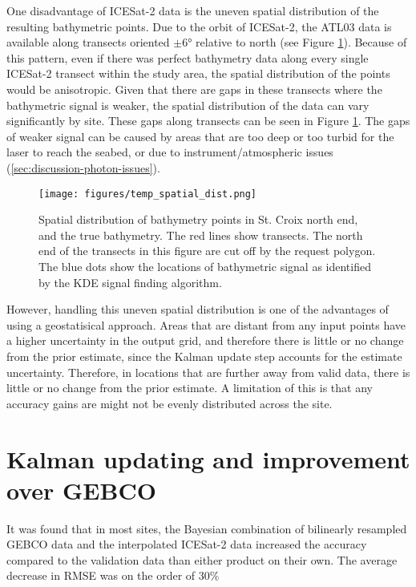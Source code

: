 One disadvantage of ICESat-2 data is the uneven spatial distribution of the resulting bathymetric points. Due to the orbit of ICESat-2, the ATL03 data is available along transects oriented $\pm \ang{6}$ relative to north (see Figure \ref{fig:distribution-of-bathy-points-in-space}). Because of this pattern, even if there was perfect bathymetry data along every single ICESat-2 transect within the study area, the spatial distribution of the points would be anisotropic. Given that there are gaps in these transects where the bathymetric signal is weaker, the spatial distribution of the data can vary significantly by site. These gaps along transects can be seen in Figure \ref{fig:distribution-of-bathy-points-in-space}. The gaps of weaker signal can be caused by areas that are too deep or too turbid for the laser to reach the seabed, or due to instrument/atmospheric issues (\ref{sec:discussion-photon-issues}). 


\begin{figure}
    \centering
    \texttt{[image: figures/temp\_spatial\_dist.png]}
    \caption{Spatial distribution of bathymetry points in St. Croix north end, and the true bathymetry. The red lines show transects. The north end of the transects in this figure are cut off by the request polygon. The blue dots show the locations of bathymetric signal as identified by the KDE signal finding algorithm.}
    \label{fig:distribution-of-bathy-points-in-space}
\end{figure}

However, handling this uneven spatial distribution is one of the advantages of using a geostatisical approach. Areas that are distant from any input points have a higher uncertainty in the output grid, and therefore there is little or no change from the prior estimate, since the Kalman update step accounts for the estimate uncertainty. Therefore, in locations that are further away from valid data, there is little or no change from the prior estimate. A limitation of this is that any accuracy gains are might not be evenly distributed across the site. 

\section{Kalman updating and improvement over GEBCO}

It was found that in most sites, the Bayesian combination of bilinearly resampled GEBCO data and the interpolated ICESat-2 data increased the accuracy compared to the validation data than either product on their own. The average decrease in RMSE was on the order of 30\% 

